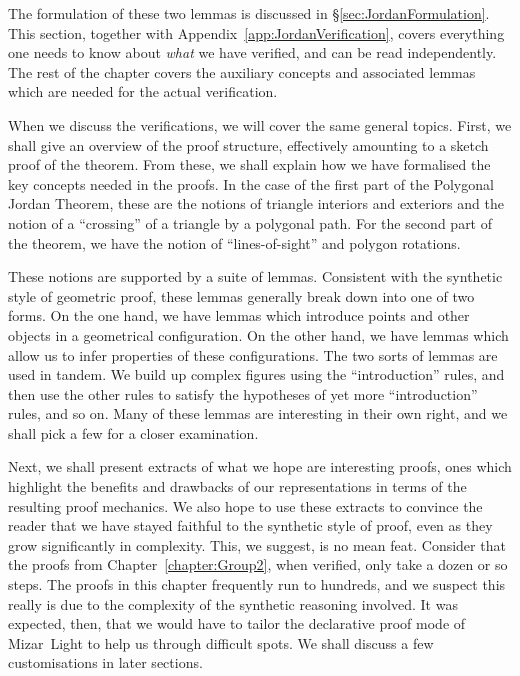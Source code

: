 The formulation of these two lemmas is discussed in \S\ref{sec:JordanFormulation}. This section, together with Appendix~\ref{app:JordanVerification}, covers everything one needs to know about \emph{what} we have verified, and can be read independently. The rest of the chapter covers the auxiliary concepts and associated lemmas which are needed for the actual verification.

When we discuss the verifications, we will cover the same general topics. First, we shall give an overview of the proof structure, effectively amounting to a sketch proof of the theorem. From these, we shall explain how we have formalised the key concepts needed in the proofs. In the case of the first part of the Polygonal Jordan Theorem, these are the notions of triangle interiors and exteriors and the notion of a ``crossing'' of a triangle by a polygonal path. For the second part of the theorem, we have the notion of ``lines-of-sight'' and polygon rotations. 

These notions are supported by a suite of lemmas. Consistent with the synthetic style of geometric proof, these lemmas generally break down into one of two forms. On the one hand, we have lemmas which introduce points and other objects in a geometrical configuration. On the other hand, we have lemmas which allow us to infer properties of these configurations. The two sorts of lemmas are used in tandem. We build up complex figures using the ``introduction'' rules, and then use the other rules to satisfy the hypotheses of yet more ``introduction'' rules, and so on. Many of these lemmas are interesting in their own right, and we shall pick a few for a closer examination.

Next, we shall present extracts of what we hope are interesting proofs, ones which highlight the benefits and drawbacks of our representations in terms of the resulting proof mechanics. We also hope to use these extracts to convince the reader that we have stayed faithful to the synthetic style of proof, even as they grow significantly in complexity. This, we suggest, is no mean feat. Consider that the proofs from Chapter~\ref{chapter:Group2}, when verified, only take a dozen or so steps. The proofs in this chapter frequently run to hundreds, and we suspect this really is due to the complexity of the synthetic reasoning involved. It was expected, then, that we would have to tailor the declarative proof mode of Mizar~Light to help us through difficult spots. We shall discuss a few customisations in later sections.

